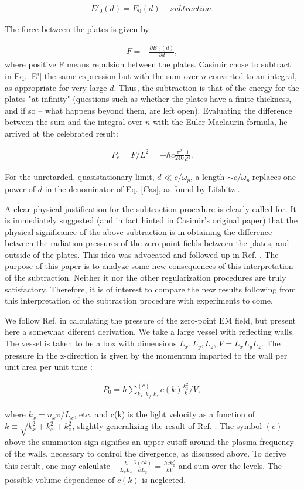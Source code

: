 \documentclass[prl,nofootinbib,twocolumn,showpacs]{revtex4}
\def\bq{\begin{eqnarray}}
\def\ee{\end{eqnarray}}
\begin{document}
\bq E'_0(d)  = E_0(d) -  subtraction. \label{E'} \ee

\noindent The  force between the plates is given by

\bq F = - \frac{\partial E'_0(d)} {\partial d}, \label{F} \ee where positive F means
repulsion between the plates. Casimir chose to subtract in Eq. \ref{E'}  the same
expression  but with the sum over $n$ converted to an integral, as appropriate for very
large $d$. Thus, the subtraction is that of the energy for the plates "at infinity"
(questions such as whether the plates have a finite thickness, and if so -- what happens
beyond them, are left open). Evaluating the difference between the sum and the integral
over $n$ with the Euler-Maclaurin formula, he arrived at the celebrated result:

\bq
P_c = F/L^2 = -\hbar c \frac{\pi^2}{240} \frac{1}{d^4}.\label{Cas}
\ee

\noindent For  the unretarded, quasistationary limit, $d \ll c/\omega_p$, a length $\sim
c/\omega_p$ replaces one power of $d$ in the denominator of Eq. \ref{Cas}, as found by
Lifshitz \cite{Lifshitz}.

A clear physical justification for the subtraction procedure is clearly called for. It is
immediately suggested \cite{Milonni-pressure} (and in fact hinted in Casimir's original
paper) that the physical significance of the above subtraction is in obtaining the
difference between the radiation pressures of the zero-point fields between the plates,
and  outside of the plates. This idea was advocated and followed up in Ref.
\cite{Milonni-pressure}. The purpose of this paper is to analyze some new consequences of
this interpretation of the subtraction. Neither it nor the other regularization
procedures are truly satisfactory. Therefore, it is of interest to compare the new
results following from this interpretation of the subtraction procedure with experiments
to come.

We follow  Ref. \cite{Milonni-pressure} in calculating the pressure of the zero-point EM
field, but present here a somewhat diferent derivation. We take a large vessel
\cite{vessel} with reflecting walls. The vessel is taken  to be a box with dimensions
$L_x, L_y, L_z$, $V = L_x L_y L_z$. The pressure in the z-direction is given by the
momentum imparted to the wall per unit area per unit time \cite{Milonni-pressure}:

\bq P_0 = \hbar \sum_{k_x,k_y,k_z}^{(c)} c(k) \frac{k_z^2}{k} /V, \label{pressure}\ee

\noindent where $k_x = n_x \pi /L_x$, etc. and c(k) is the light velocity as a function
of $k \equiv \sqrt{k_x^2 + k_x^2 + k_z^2}$, slightly generalizing the result of Ref.
\cite{Milonni-pressure}. The symbol  $(c)$ above the summation sign signifies an upper
cutoff around the plasma frequency of the walls, necessary to control the divergence, as
discussed above. To derive this result, one may calculate \cite{check} $-\frac{\hbar
}{L_y L_z}\frac{\partial (c k)}{\partial L_z} = \frac{\hbar c k_z^2}{k V}$ and sum over
the levels. The possible volume dependence of $c(k)$ is neglected.
\end{document}
